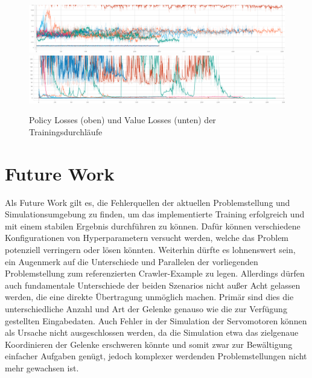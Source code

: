 \begin{figure}
    \centering
    \includegraphics[width = \textwidth]{Bilder/ml-agents/Losses_Policy Loss.pdf}
    \includegraphics[width = \textwidth]{Bilder/ml-agents/Losses_Value Loss.pdf}
    \caption[Policy und Value Losses der Trainingsdurchläufe]{Policy Losses (oben) und Value Losses (unten) der Trainingsdurchläufe}
    \label{fig:losses}
\end{figure}


\section{Future Work}
Als Future Work gilt es, die Fehlerquellen der aktuellen Problemstellung und Simulationsumgebung zu finden, um das implementierte Training erfolgreich und mit einem stabilen Ergebnis durchführen zu können.
Dafür können verschiedene Konfigurationen von Hyperparametern versucht werden, welche das Problem potenziell verringern oder lösen könnten.
Weiterhin dürfte es lohnenswert sein, ein Augenmerk auf die Unterschiede und Parallelen der vorliegenden Problemstellung zum referenzierten Crawler-Example zu legen.
Allerdings dürfen auch fundamentale Unterschiede der beiden Szenarios nicht außer Acht gelassen werden, die eine direkte Übertragung unmöglich machen.
Primär sind dies die unterschiedliche Anzahl und Art der Gelenke genauso wie die zur Verfügung gestellten Eingabedaten.
Auch Fehler in der Simulation der Servomotoren können als Ursache nicht ausgeschlossen werden, da die Simulation etwa das zielgenaue Koordinieren der Gelenke erschweren könnte und somit zwar zur Bewältigung einfacher Aufgaben genügt, jedoch komplexer werdenden Problemstellungen nicht mehr gewachsen ist.

